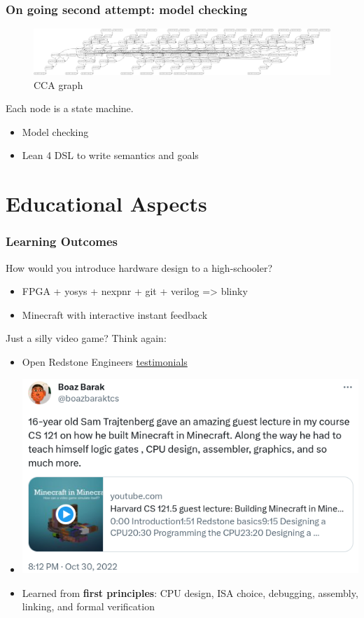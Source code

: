 \documentclass[aspectratio=169]{beamer}
\begin{document}
\begin{frame}
	\frametitle{On going second attempt: model checking}
	\begin{figure}
		\includegraphics[width=\linewidth]{imgs/cca.png}
		\caption{CCA graph}
	\end{figure}

	Each node is a state machine.

	\begin{itemize}
		\item Model checking
		\item Lean 4 DSL to write semantics and goals
	\end{itemize}
\end{frame}

\section{Educational Aspects}

\begin{frame}
	\frametitle{Learning Outcomes}
	How would you introduce hardware design to a high-schooler?
	\begin{itemize}
		\item FPGA + yosys + nexpnr + git + verilog => blinky
		\item Minecraft with interactive instant feedback
	\end{itemize}
	Just a silly video game? Think again:
	\begin{itemize}
		\item Open Redstone Engineers \href{https://openredstone.org/testimonials}{testimonials}
		\item \includegraphics[width=.4\textwidth]{imgs/tweet.png}
		\item Learned from \textbf{first principles}: CPU design, ISA choice, debugging, assembly, linking, and formal verification
	\end{itemize}

\end{frame}
\end{document}
